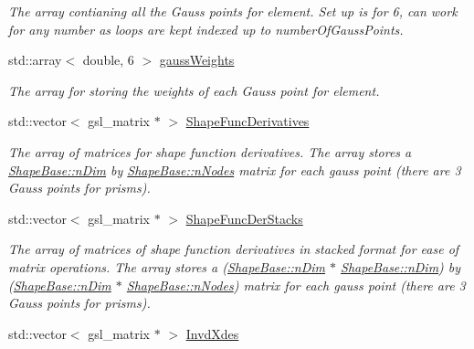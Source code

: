 \begin{DoxyCompactItemize}
\begin{DoxyCompactList}\small\item\em The array contianing all the Gauss points for element. Set up is for 6, can work for any number as loops are kept indexed up to number\+Of\+Gauss\+Points. \end{DoxyCompactList}\item 
\hypertarget{classShapeBase_a50ec0d74748313a30a280258bd1e1827}{}std\+::array$<$ double, 6 $>$ \hyperlink{classShapeBase_a50ec0d74748313a30a280258bd1e1827}{gauss\+Weights}\label{classShapeBase_a50ec0d74748313a30a280258bd1e1827}

\begin{DoxyCompactList}\small\item\em The array for storing the weights of each Gauss point for element. \end{DoxyCompactList}\item 
\hypertarget{classShapeBase_a9451400710c0458e286c9183b8014a71}{}std\+::vector$<$ gsl\+\_\+matrix $\ast$ $>$ \hyperlink{classShapeBase_a9451400710c0458e286c9183b8014a71}{Shape\+Func\+Derivatives}\label{classShapeBase_a9451400710c0458e286c9183b8014a71}

\begin{DoxyCompactList}\small\item\em The array of matrices for shape function derivatives. The array stores a \hyperlink{classShapeBase_a0ae4246d158f4d66b5bd1644df40f150}{Shape\+Base\+::n\+Dim} by \hyperlink{classShapeBase_a0daa5629b1335ca3e1be089a006fe897}{Shape\+Base\+::n\+Nodes} matrix for each gauss point (there are 3 Gauss points for prisms). \end{DoxyCompactList}\item 
\hypertarget{classShapeBase_a21657fc100e70eaec475616adf308f81}{}std\+::vector$<$ gsl\+\_\+matrix $\ast$ $>$ \hyperlink{classShapeBase_a21657fc100e70eaec475616adf308f81}{Shape\+Func\+Der\+Stacks}\label{classShapeBase_a21657fc100e70eaec475616adf308f81}

\begin{DoxyCompactList}\small\item\em The array of matrices of shape function derivatives in stacked format for ease of matrix operations. The array stores a (\hyperlink{classShapeBase_a0ae4246d158f4d66b5bd1644df40f150}{Shape\+Base\+::n\+Dim} $\ast$ \hyperlink{classShapeBase_a0ae4246d158f4d66b5bd1644df40f150}{Shape\+Base\+::n\+Dim}) by (\hyperlink{classShapeBase_a0ae4246d158f4d66b5bd1644df40f150}{Shape\+Base\+::n\+Dim} $\ast$ \hyperlink{classShapeBase_a0daa5629b1335ca3e1be089a006fe897}{Shape\+Base\+::n\+Nodes}) matrix for each gauss point (there are 3 Gauss points for prisms). \end{DoxyCompactList}\item 
\hypertarget{classShapeBase_aad96a4f7ac584f37627a341f1c6a6156}{}std\+::vector$<$ gsl\+\_\+matrix $\ast$ $>$ \hyperlink{classShapeBase_aad96a4f7ac584f37627a341f1c6a6156}{Invd\+Xdes}\label{classShapeBase_aad96a4f7ac584f37627a341f1c6a6156}


\end{DoxyCompactItemize}
